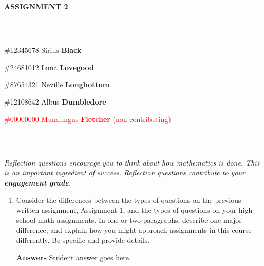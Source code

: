\documentclass{article}
\begin{document}
\large{\textbf{ASSIGNMENT 2}}

\normalsize

\

\begin{tabular*}{6.5in}{c}
\hline
\end{tabular*}



\begin{itemize}
    \item \#12345678 Sirius {\bf Black} 
    \item \#24681012 Luna {\bf Lovegood}
    \item \#87654321 Neville {\bf Longbottom}
    \item \#12108642 Albus {\bf Dumbledore}
    \textcolor{red}{\item \#00000000 Mundungus {\bf Fletcher}  (non-contributing)}
\end{itemize}

\begin{tabular*}{6.5in}{c}
\hline
\end{tabular*}

\ 

\textit{Reflection questions encourage you to think about how mathematics is done. This is an important ingredient of success. Reflection questions contribute to your \textbf{engagement grade}.}

\begin{enumerate}[leftmargin=*] 

\item Consider the differences between the types of questions on the previous written assignment, Assignment 1, and the types of questions on your high school math assignments. In one or two paragraphs, describe one major difference, and explain how you might approach assignments in this course differently. Be specific and provide details.

\color{blue}
\textbf{Answers} \newline 
Student answer goes here.
\color{black}


\end{enumerate}

\begin{tabular*}{6.5in}{c}
\hline
\end{tabular*}
\end{document}
